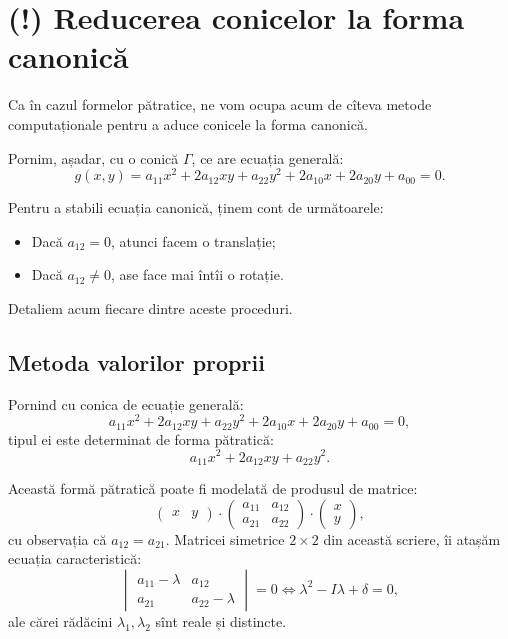 
\section{(!) Reducerea conicelor la forma canonică}

\indent\indent Ca în cazul formelor pătratice, ne vom ocupa acum de cîteva 
metode computaționale pentru a aduce conicele la forma canonică.

Pornim, așadar, cu o conică $\Gamma$, ce are ecuația generală: 
 \[
	g(x, y) = a_{11} x^2 + 2a_{12} xy + a_{22} y^2 + 2a_{10} x + 2a_{20} y +
	            a_{00} = 0.
\]

Pentru a stabili ecuația canonică, ținem cont de următoarele:
\begin{itemize}
	\item Dacă $a_{12} = 0$, atunci facem o translație;
	\item Dacă $a_{12} \neq 0$, ase face mai întîi o rotație.
\end{itemize}

Detaliem acum fiecare dintre aceste proceduri.


\subsection{Metoda valorilor proprii}

Pornind cu conica de ecuație generală: 
 \[
    a_{11} x^2 + 2a_{12} xy + a_{22} y^2 + 2a_{10} x + 2a_{20} y + a_{00} = 0,
\]
tipul ei este determinat de forma pătratică: 
 \[
	a_{11} x^2 + 2a_{12}xy + a_{22} y^2.
\]

Această formă pătratică poate fi modelată de produsul de matrice: 
 \[
	\begin{pmatrix}
	    x & y
    \end{pmatrix} \cdot \begin{pmatrix}
	                        a_{11} & a_{12} \\
	                        a_{21} & a_{22}
                        \end{pmatrix} \cdot \begin{pmatrix}
	                                            x \\
	                                            y
                                            \end{pmatrix},
\]
cu observația că $a_{12} = a_{21}$. Matricei simetrice $2 \times 2$ din această
scriere, îi atașăm ecuația caracteristică: 
 \[
	\begin{vmatrix}
	    a_{11} - \lambda & a_{12} \\
	    a_{21} & a_{22} - \lambda
    \end{vmatrix} = 0 \Longleftrightarrow \lambda^2 - I \lambda + \delta = 0,
\]
ale cărei rădăcini $\lambda_1, \lambda_2$ sînt reale și distincte.

